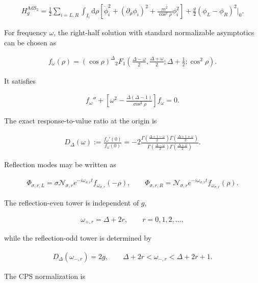 \begin{align}
H_g^{\mathrm{AdS}_2}
=\frac12\sum_{i=L,R}\int_{I_i}\mathrm d\rho
\left[
\dot\phi_i^2+(\partial_\rho\phi_i)^2
+\frac{m^2}{\cos^2\rho}\phi_i^2
\right]
+\frac g2(\phi_L-\phi_R)^2\big|_0.
\end{align}

For frequency $\omega$, the right-half solution with standard normalizable asymptotics can be chosen as

\begin{align}
f_\omega(\rho)
=(\cos\rho)^\Delta
{}_2F_1\left(
\frac{\Delta-\omega}{2},
\frac{\Delta+\omega}{2};
\Delta+\frac12;
\cos^2\rho
\right).
\end{align}

It satisfies

\begin{align}
f_\omega''
+\left[
\omega^2-\frac{\Delta(\Delta-1)}{\cos^2\rho}
\right]f_\omega=0.
\end{align}

The exact response-to-value ratio at the origin is

\begin{align}
D_\Delta(\omega)
:=\frac{f_\omega'(0)}{f_\omega(0)}
=-2
\frac{
\Gamma\left(\frac{\Delta+1-\omega}{2}\right)
\Gamma\left(\frac{\Delta+1+\omega}{2}\right)}{
\Gamma\left(\frac{\Delta-\omega}{2}\right)
\Gamma\left(\frac{\Delta+\omega}{2}\right)}.
\end{align}

Reflection modes may be written as

\begin{align}
\Phi_{\sigma,r,L}
=\sigma\mathcal N_{\sigma,r}e^{-i\omega_{\sigma,r}t}
f_{\omega_{\sigma,r}}(-\rho),
\qquad
\Phi_{\sigma,r,R}
=\mathcal N_{\sigma,r}e^{-i\omega_{\sigma,r}t}
f_{\omega_{\sigma,r}}(\rho).
\end{align}

The reflection-even tower is independent of $g$,

\begin{align}
\omega_{+,r}=\Delta+2r,
\qquad
r=0,1,2,\ldots,
\end{align}

while the reflection-odd tower is determined by

\begin{align}
D_\Delta(\omega_{-,r})=2g,
\qquad
\Delta+2r<\omega_{-,r}<\Delta+2r+1.
\end{align}

The CPS normalization is

